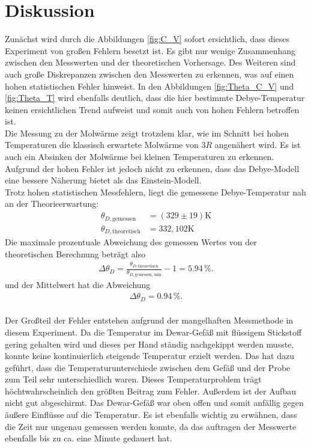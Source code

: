 \section{Diskussion}
\label{sec:Diskussion}
Zunächst wird durch die Abbildungen \ref{fig:C_V} sofort ersichtlich, dass dieses Experiment von großen Fehlern besetzt ist. 
Es gibt nur wenige Zusammenhang zwischen den Messwerten und der theoretischen Vorhersage. Des Weiteren sind 
auch große Diskrepanzen zwischen den Messwerten zu erkennen, was auf einen hohen statistischen Fehler hinweist. In den Abbildungen 
\ref{fig:Theta_C_V} und \ref{fig:Theta_T} wird ebenfalls deutlich, dass die hier bestimmte Debye-Temperatur keinen ersichtlichen Trend aufweist 
und somit auch von hohen Fehlern betroffen ist. \\
Die Messung zu der Molwärme zeigt trotzdem klar, wie im Schnitt bei hohen Temperaturen die klassisch erwartete Molwärme von $3 R$ angenähert wird. 
Es ist auch ein Absinken der Molwärme bei kleinen Temperaturen zu erkennen. Aufgrund der hohen Fehler ist jedoch nicht zu erkennen, dass das Debye-Modell eine bessere Näherung 
bietet als das Einstein-Modell.  \\

Trotz hohen statistischen Messfehlern, liegt die gemessene Debye-Temperatur nah an der Theorieerwartung:
\begin{align*}
    \theta_{D,\text{gemessen}} &= (329 \pm 19) \si{\kelvin}\\
    \theta_{D,\text{theoretisch}} &= 332,102 \si{\kelvin}
\end{align*}
Die maximale prozentuale Abweichung des gemessen Wertes von der theoretischen Berechnung beträgt also
\begin{align*}
    \Delta \theta_D =\frac{\theta_{D,\text{theoretisch}}}{\theta_{D,\text{gemessen, min}}} -1 =  5.94 \,\si{\%}.
\end{align*}
und der Mittelwert hat die Abweichung
\begin{align*}
    \Delta \theta_D =  0.94 \,\si{\%}.
\end{align*}
\\ 
Der Großteil der Fehler entstehen aufgrund der mangelhaften Messmethode in diesem Experiment. Da die Temperatur im Dewar-Gefäß mit flüssigem Stickstoff 
gering gehalten wird und dieses per Hand ständig nachgekippt werden musste, konnte keine kontinuierlich steigende Temperatur erzielt werden. 
Das hat dazu geführt, dass die Temperaturunterschiede zwischen dem Gefäß und der Probe zum Teil sehr unterschiedlich waren. 
Dieses Temperaturproblem trägt höchtwahrscheinlich den größten Beitrag zum Fehler. 
Außerdem ist der Aufbau nicht gut abgeschirmt. Das Dewar-Gefäß war oben offen und somit anfällig gegen äußere Einflüsse auf die Temperatur. 
Es ist ebenfalls wichtig zu erwähnen, dass die Zeit nur ungenau gemessen werden konnte, da das auftragen der Messwerte ebenfalls bis zu ca. eine Minute gedauert hat. 
